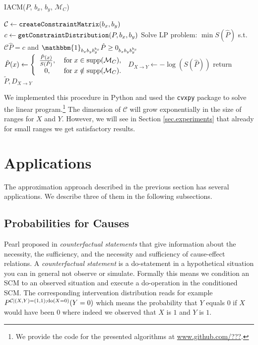 \documentclass[letterpaper]{article}
\newcommand{\kC}{\mathcal{C}}   %
\newcommand{\kM}{\mathcal{M}}   %
\newcommand{\Ind}{\mathbbm{1}} %
\newcommand{\code}[1]{\texttt{#1}}
\newcommand{\DO}{{\rm do}}
\newcommand{\supp}{{\rm supp}}
\begin{document}
\begin{algorithm}
\caption{IACM($P$, $b_x$, $b_y$, $\kM_C$)}
\label{alg.approximationAlgo}
\begin{algorithmic}[1]
\State $\kC \gets {\rm \code{createConstraintMatrix}}(b_x, b_y)$
\State $c \gets {\rm \code{getConstraintDistribution}}(P, b_x, b_y)$
\State Solve LP problem: $\min S(\hat P)$ s.t. $\kC \hat P = c$ and $\Ind_{b_x b_y b_y^{b_x}} \hat P \ge 0_{b_x b_y b_y^{b_x}}$
\State $\tilde P(x) \gets \left \{ \begin{array}{cc} \frac{\hat P(x)}{S(\hat P)}, & \;{\rm for}\; x\in \supp(\kM_C), \\
0, & \; {\rm for}\; x\notin\supp(\kM_C). \end{array} \right.$
\State $D_{X\rightarrow Y} \gets -\log(S(\hat P))$
\State return $\tilde P, D_{X \rightarrow Y}$
\end{algorithmic}
\end{algorithm}

We implemented this procedure in Python and used the \code{cvxpy} package to solve the linear program.\footnote{We provide the code for the presented algorithms at \url{www.github.com/???}.} The dimension of $\kC$ will grow exponentially in the size of ranges for $X$ and $Y$. However, we will see in Section \ref{sec.experiments} that already for small ranges we get satisfactory results.

\section{Applications} \label{sec.applications}

The approximation approach described in the previous section has several applications. We describe three of them in the following subsections.

\subsection{Probabilities for Causes}

Pearl proposed in \cite{Pea09} {\em counterfactual statements} that give information about the necessity, the sufficiency, and the necessity and sufficiency of cause-effect relations. A {\em counterfactual statement} is a do-statement in a hypothetical situation you can in general not observe or simulate. Formally this means we condition an SCM to an observed situation and execute a do-operation in the conditioned SCM. The corresponding intervention distribution reads for example $P^{\kC |(X,Y)=(1,1);\DO{(X=0)}}(Y=0)$ which means the probability that $Y$ equals $0$ if $X$ would have been $0$ where indeed we observed that $X$ is $1$ and $Y$ is $1$.
\end{document}
